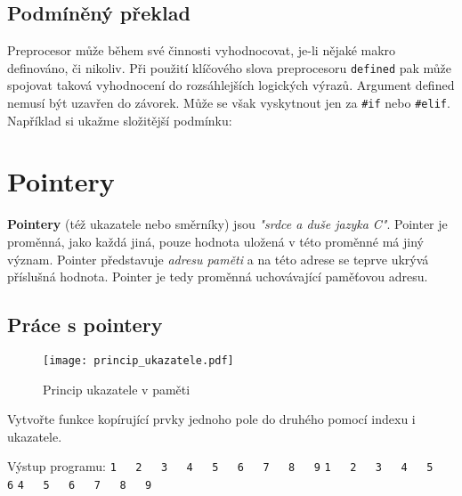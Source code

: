 {    \subsection{Podmíněný překlad}  
      Preprocesor může během své činnosti vyhodnocovat, je-li nějaké makro definováno, či nikoliv. 
      Při použití klíčového slova preprocesoru \texttt{defined} pak může spojovat taková 
      vyhodnocení do rozsáhlejších logických výrazů. Argument defined nemusí být uzavřen do 
      závorek. Může se však vyskytnout jen za \lstinline[basicstyle=\ttfamily]!#if! nebo 
      \lstinline[basicstyle=\ttfamily]!#elif!. Například si ukažme složitější podmínku:

  \section{Pointery}
    \textbf{Pointery} (též ukazatele nebo směrníky) jsou \emph{"srdce a duše jazyka C"}. Pointer je 
    proměnná, jako každá jiná, pouze hodnota uložená v této proměnné má jiný význam. Pointer 
    představuje \textit{adresu paměti} a na této adrese se teprve ukrývá příslušná hodnota. Pointer 
    je tedy proměnná uchovávající paměťovou adresu.\cite{Herout}
  
    \subsection{Práce s pointery}
      \begin{figure}
        \centering
        \texttt{[image: princip\_ukazatele.pdf]}
        \caption{Princip ukazatele v paměti}
        \label{figure:pointer1}
      \end{figure}
      \begin{example}Vytvořte funkce kopírující prvky jednoho pole do druhého pomocí indexu i 
      ukazatele.
      
        
        Výstup programu:                                                     \newline
          \lstinline[basicstyle=\ttfamily]!1   2   3   4   5   6   7   8   9!\newline
          \lstinline[basicstyle=\ttfamily]!1   2   3   4   5   6!            \newline
          \lstinline[basicstyle=\ttfamily]!4   5   6   7   8   9!            \newline
      \end{example} 

}
